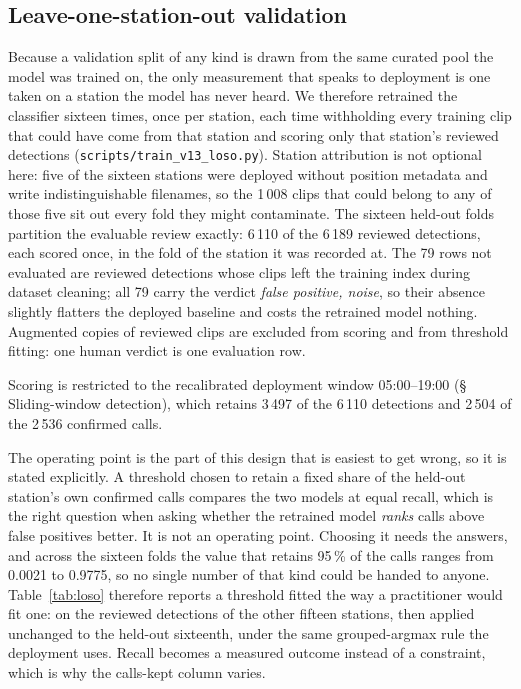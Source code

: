 \documentclass[review,3p,times]{elsarticle}
\begin{document}
\subsection*{Leave-one-station-out validation}

Because a validation split of any kind is drawn from the same curated pool the
model was trained on, the only measurement that speaks to deployment is one
taken on a station the model has never heard. We therefore retrained the
classifier sixteen times, once per station, each time withholding every
training clip that could have come from that station and scoring only that
station's reviewed detections (\texttt{scripts/train\_v13\_loso.py}). Station
attribution is not optional here: five of the sixteen stations were deployed
without position metadata and write indistinguishable filenames, so the
1\,008 clips that could belong to any of those five sit out every fold they
might contaminate. The sixteen held-out folds partition
the evaluable review exactly: 6\,110 of the 6\,189 reviewed detections, each
scored once, in the fold of the station it was recorded at. The 79 rows not
evaluated are reviewed detections whose clips left the training index during
dataset cleaning; all 79 carry the verdict \emph{false positive, noise}, so
their absence slightly flatters the deployed baseline and costs the retrained
model nothing. Augmented copies of reviewed clips are excluded from scoring
and from threshold fitting: one human verdict is one evaluation row.

Scoring is restricted to the recalibrated deployment window 05:00--19:00
(\S\,Sliding-window detection), which retains 3\,497 of the 6\,110 detections
and 2\,504 of the 2\,536 confirmed calls.

The operating point is the part of this design that is easiest to get wrong, so
it is stated explicitly. A threshold chosen to retain a fixed share of the
held-out station's own confirmed calls compares the two models at equal recall,
which is the right question when asking whether the retrained model \emph{ranks}
calls above false positives better. It is not an operating point. Choosing it
needs the answers, and across the sixteen folds the value that retains 95\,\% of
the calls ranges from 0.0021 to 0.9775, so no single number of that kind could be
handed to anyone. Table~\ref{tab:loso} therefore reports a threshold fitted the
way a practitioner would fit one: on the reviewed detections of the other fifteen
stations, then applied unchanged to the held-out sixteenth, under the same
grouped-argmax rule the deployment uses. Recall becomes a measured outcome
instead of a constraint, which is why the calls-kept column varies.
\end{document}
